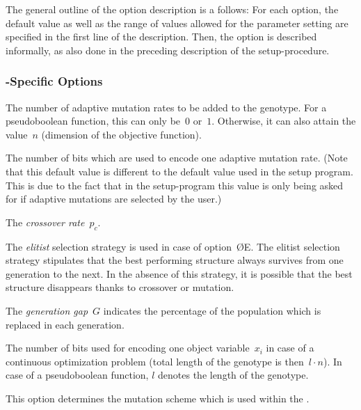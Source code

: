 The general outline of the option description is a follows:
For each option, the default value as well as the range of values allowed
for the parameter setting are specified in the first line of the description.	
Then, the option is described informally, as also done in the preceding
description of the setup-procedure.

\subsubsection{\GA-Specific Options}\label{genesis-subsubspecific}

\begin{Enumerate}
%
\item	{}
	The number of adaptive mutation rates to be added to the genotype.
	For a pseudoboolean function, this can only be~$0$ or~$1$.
	Otherwise, it can also attain the value~$n$ (dimension of the objective
	function).
%
\item	{}			
	The number of bits which are used to encode one adaptive mutation
	rate. (Note that this default value is different to the default value
	used in the setup program. 
	This is due to the fact that in the setup-program this value is
	only being asked for if adaptive mutations are selected by the user.)
%
\item	{}		
	The {\em crossover rate\/}~$p_c$.
%
\item	{}
	The {\em elitist\/} selection strategy is used in case of 
	option~\O{E}.
	The elitist selection strategy stipulates that the best performing
	structure always survives from one generation to the next.
	In the absence of this strategy, it is possible that the best
	structure disappears thanks to crossover or mutation.
%
\item	{}
	The {\em generation gap\/}~$G$ indicates the percentage of the
	population which is replaced in each generation.
%
\item	{}
	The number of bits used for encoding one object variable~$x_i$
	in case of a continuous optimization problem (total length of the
	genotype is then~$l \cdot n$).
	In case of a pseudoboolean function, $l$ denotes the length of the
	genotype.
%
\item	{}
	This option determines the mutation scheme which is used within
	the \GA. 

\end{Enumerate}

